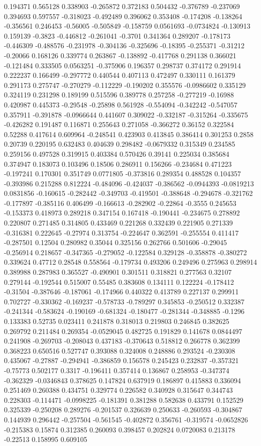 0.194371 0.565128 0.338903 -0.265872 0.372183 0.504432 -0.376789 -0.237069 0.394693 0.597557 -0.318023 -0.492489 0.396062 0.353408 -0.174208 -0.138264 -0.356561 0.246453 -0.56005 -0.505849 -0.158759 0.0561693 -0.0734824 -0.130913 0.159139 -0.3823 -0.446812 -0.261041 -0.3701 0.341364 0.289207 -0.178173 -0.446309 -0.488576 -0.231978 -0.304136 -0.325696 -0.18395 -0.255371 -0.31212 -0.20066 0.168126 0.339774 0.263867 -0.138892 -0.417768 0.291138 0.366021 -0.121484 0.333505 0.0563251 -0.375906 0.196357 0.298737 0.374172 0.291914 0.222237 0.166499 -0.297772 0.440544 0.407113 0.472497 0.330111 0.161379 0.291173 0.275747 -0.270279 -0.112229 -0.190202 0.355576 -0.0986602 0.335129 0.324119 0.231298 0.189199 0.515596 0.389778 0.257258 -0.277219 -0.16988 0.420987 0.445373 -0.29548 -0.25898 0.561928 -0.554094 -0.342242 -0.547057 0.357911 -0.391878 -0.0966644 0.441607 0.309022 -0.332187 -0.315264 -0.335675 -0.426282 0.191487 0.116871 0.255643 0.271058 -0.366272 0.36152 0.322584 0.52288 0.417614 0.609964 -0.248541 0.423903 0.413845 0.386414 0.301253 0.2858 0.20739 0.220195 0.632483 0.404639 0.298482 -0.0679332 0.315349 0.234585 0.259156 0.497528 0.319915 0.403384 0.570426 0.39141 0.225034 0.385684 0.374947 0.183073 0.103496 0.18506 0.286911 0.156266 -0.234684 0.471223 -0.197241 0.170301 0.351749 0.0771805 -0.373816 0.289354 0.488528 0.104357 -0.393986 0.215288 0.812224 -0.484096 -0.424037 -0.386562 -0.0944393 -0.0819213 0.0831856 -0.160615 -0.282442 -0.349703 -0.419501 -0.388648 -0.294678 -0.321762 -0.177897 -0.385116 0.406499 -0.166613 -0.282902 -0.22864 -0.3555 0.245653 -0.153373 0.418973 0.289218 0.347154 0.167418 -0.190441 -0.234675 0.278892 0.220807 0.271485 0.314805 0.433469 0.221268 0.332439 0.221905 0.271339 -0.316381 0.222645 -0.27974 0.313754 -0.224647 0.362591 -0.255554 0.411417 -0.287501 0.12504 0.280982 0.35044 0.325156 0.262766 0.501606 -0.29045 -0.256914 0.218657 -0.347365 -0.279052 -0.122584 0.329128 -0.358878 -0.380272 0.339624 0.47712 0.28548 0.558564 -0.179734 0.493206 0.249496 0.275963 0.298914 0.389988 0.287983 0.365527 -0.490901 0.301511 0.318821 0.277563 0.32107 0.279144 -0.192544 0.515007 0.55485 0.383608 0.134111 0.122224 -0.178412 -0.31504 -0.387646 -0.187061 -0.174966 0.440322 0.413789 0.227137 0.299911 0.702727 -0.330362 -0.169237 -0.578733 -0.789297 0.345853 -0.250512 0.332387 -0.241344 -0.583624 -0.190169 -0.681324 -0.180477 -0.281344 -0.348885 -0.1296 0.133383 0.52735 0.023411 0.241878 0.318013 0.219803 0.246845 0.382625 0.269792 0.211484 0.269354 -0.0529045 0.482725 0.191829 0.141678 0.0844497 0.241908 -0.269703 -0.208043 0.437183 -0.370643 0.518812 0.266778 0.362399 0.368223 0.650516 0.527747 0.393088 0.324008 0.248886 0.293524 -0.230308 0.435067 -0.27887 -0.294941 -0.386859 0.156578 0.245423 0.232837 -0.357321 -0.75773 0.502177 0.3317 -0.196411 0.357414 0.136867 0.258953 -0.347374 -0.362329 -0.0346843 0.378625 0.147824 0.637919 0.186897 0.415883 0.336094 0.251469 0.260388 0.434751 0.329774 0.226582 0.340928 0.315647 0.344743 0.228303 -0.114471 -0.0998225 -0.181391 0.381288 0.582638 0.433791 0.152529 0.325339 -0.250208 0.289276 -0.201537 0.326639 0.250633 -0.260593 -0.304867 0.144939 0.296442 -0.257504 -0.561545 -0.402872 0.356761 -0.319574 -0.0652826 -0.215383 0.15874 0.312385 0.260093 0.398457 0.202824 0.0720083 0.213178 -0.22513 0.158995 0.609105 